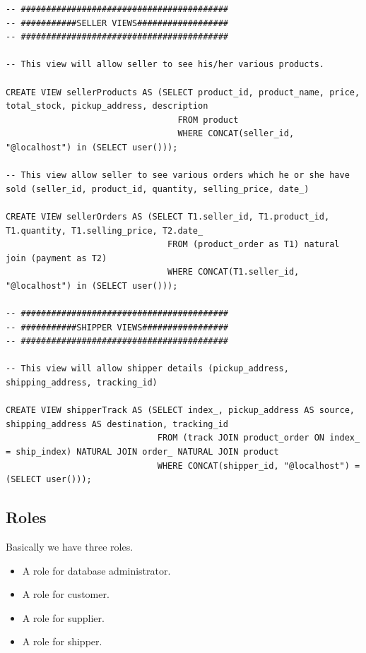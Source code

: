 \documentclass[a4paper,12pt]{article}
\begin{document}
\begin{verbatim}
-- #########################################
-- ###########SELLER VIEWS##################
-- #########################################

-- This view will allow seller to see his/her various products.

CREATE VIEW sellerProducts AS (SELECT product_id, product_name, price, total_stock, pickup_address, description 
                                  FROM product
                                  WHERE CONCAT(seller_id, "@localhost") in (SELECT user()));

-- This view allow seller to see various orders which he or she have sold (seller_id, product_id, quantity, selling_price, date_) 

CREATE VIEW sellerOrders AS (SELECT T1.seller_id, T1.product_id, T1.quantity, T1.selling_price, T2.date_
                                FROM (product_order as T1) natural join (payment as T2)
                                WHERE CONCAT(T1.seller_id, "@localhost") in (SELECT user()));

-- #########################################
-- ###########SHIPPER VIEWS#################
-- #########################################

-- This view will allow shipper details (pickup_address, shipping_address, tracking_id)

CREATE VIEW shipperTrack AS (SELECT index_, pickup_address AS source, shipping_address AS destination, tracking_id
                              FROM (track JOIN product_order ON index_ = ship_index) NATURAL JOIN order_ NATURAL JOIN product 
                              WHERE CONCAT(shipper_id, "@localhost") = (SELECT user()));
\end{verbatim}

\subsection{Roles}
Basically we have three roles.

\begin{itemize}
    \item A role for database administrator.
    \item A role for customer.
    \item A role for supplier.
    \item A role for shipper.
\end{itemize}
\end{document}
